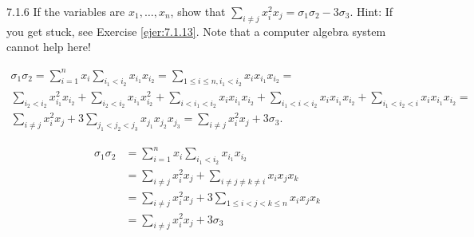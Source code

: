 \documentclass[twoside]{article}
\begin{document}
\begin{ejercicio}{7.1.6}
If the variables are $x_1, \dots , x_n$, show that $\sum_{i\neq j} x^2_i
x_j = σ_1σ_2 −3σ_3$. Hint: If you get stuck,
see Exercise \ref{ejer:7.1.13}. Note that a computer algebra system cannot help here!
\end{ejercicio}
\begin{solucion}
\begin{gather*}
\sigma_1\sigma_2=\sum_{i=1}^nx_i\sum_{i_1<i_2}x_{i_1}x_{i_2}=\sum_{1\leq i\leq n, i_1<i_2}x_ix_{i_1}x_{i_2}=\\
\sum_{i_2<i_2}x_{i_1}^2x_{i_2}+\sum_{i_2<i_2}x_{i_1}x_{i_2}^2+\sum_{i<i_1<i_2}x_ix_{i_1}x_{i_2}+\sum_{i_1<i<i_2}x_ix_{i_1}x_{i_2}+\sum_{i_1<i_2<i}x_ix_{i_1}x_{i_2}=\\
\sum_{i\neq j} x_i^2x_j+3\sum_{j_1<j_2<j_3}x_{j_1}x_{j_2}x_{j_3}=\sum_{i\neq j} x_i^2x_j+3\sigma_3.
\end{gather*}
\end{solucion}
\begin{solucion}
\begin{align*}
\sigma_1\sigma_2&=\sum_{i=1}^nx_i\sum_{i_1<i_2}x_{i_1}x_{i_2}\\
&=\sum_{i\neq j}x_i^2x_j + \sum_{i\neq j \neq k \neq i} x_i x_j x_k\\
&=\sum_{i\neq j}x_i^2x_j + 3\sum_{1\leq i<j<k\leq n} x_i x_j x_k\\
&=\sum_{i\neq j} x_i^2x_j + 3\sigma_3
\end{align*}
\end{solucion}
\newpage
\end{document}
